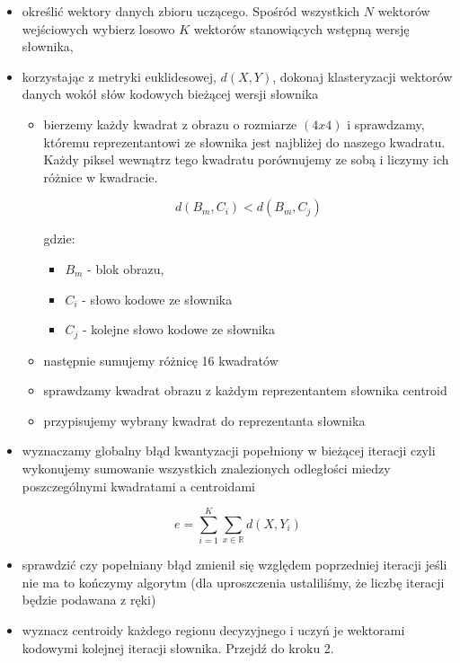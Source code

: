 \documentclass{article}
\begin{document}
\begin{itemize} 
  \item określić wektory danych zbioru uczącego. Spośród wszystkich $N$ wektorów wejściowych
        wybierz losowo $K$ wektorów stanowiących wstępną wersję słownika,
  \item korzystając z metryki euklidesowej, $d(X,Y)$, dokonaj klasteryzacji wektorów danych wokół słów kodowych bieżącej wersji słownika
        \begin{itemize}
          \item bierzemy każdy kwadrat z obrazu o rozmiarze $(4x4)$ i sprawdzamy, któremu reprezentantowi ze słownika jest najbliżej do
                naszego kwadratu. Każdy piksel wewnątrz tego kwadratu porównujemy ze sobą i liczymy ich różnice w kwadracie.
                
                \begin{equation}
                  d(B_{m}, C_{i}) < d(B_{m}, C_{j})
                \end{equation}
                
                gdzie:
                \begin{itemize}[label=]
                  \item $B_{m}$ - blok obrazu,
                  \item $C_{i}$ - słowo kodowe ze słownika
                  \item $C_{j}$ - kolejne słowo kodowe ze słownika
                \end{itemize}
                
          \item następnie sumujemy różnicę 16 kwadratów
          \item sprawdzamy kwadrat obrazu z każdym reprezentantem słownika centroid
          \item przypisujemy wybrany kwadrat do reprezentanta słownika
        \end{itemize}
  \item wyznaczamy globalny błąd kwantyzacji popełniony w bieżącej iteracji czyli wykonujemy sumowanie wszystkich
        znalezionych odległości miedzy poszczególnymi kwadratami a centroidami 
        
        \begin{equation}
          \label{eq:lbg_error}
          e = \sum_{i=1}^K \sum_{x\in\mathbb{R}} d(X, Y_{i}) 
        \end{equation}
        
  \item sprawdzić czy popełniany błąd zmienił się względem poprzedniej iteracji jeśli nie ma to kończymy algorytm
        (dla uproszczenia ustaliliśmy, że liczbę iteracji będzie podawana z ręki)
  \item wyznacz centroidy każdego regionu decyzyjnego i uczyń je wektorami kodowymi kolejnej iteracji słownika. Przejdź do kroku 2.
\end{itemize}
\end{document}
